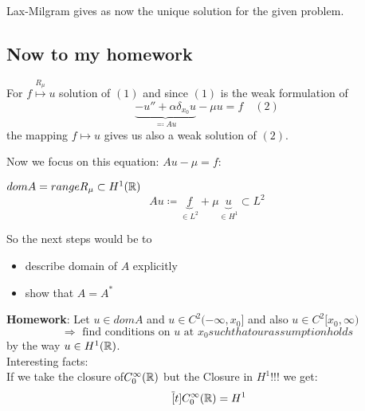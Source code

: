 Lax-Milgram gives as now the unique solution for the given problem.


\subsection{Now to my homework}
For $f \overset{R_{\mu}}{\mapsto} u$ solution of $(1)$ and since $(1)$ is the weak formulation of 
	\[ \underbrace{- u'' + \alpha \delta_{x_{0}} u}_{\eqqcolon A u} - \mu u = f \quad (2)\]
the mapping $f \mapsto u$ gives us also a weak solution of $(2)$.
\newline

Now we focus on this equation: $A u - \mu = f$: \\

\begin{definition}
	$dom A = range R_{\mu} \subset H^{1}(\mathbb{R})$
	\[ A u \coloneqq \underbrace{f}_{\in L^{2}} + \mu \underbrace{u}_{\in H^{1}} \subset L^{2}  \]	
\end{definition}

So the next steps would be to 
\begin{itemize}
	\item describe domain of $A$ explicitly
	\item show that $A = A^{*}$
\end{itemize}


\textbf{Homework}: Let $u \in dom A$ and $u \in C^{2}(-\infty, x_{0}]$ and also $u \in C^{2}[x_{0}, \infty)$ \\
\[ \Rightarrow \text{ find conditions on } u \text{ at } x_{0} such that our assumption holds \]
by the way $u \in H^{1}(\mathbb{R})$. \\

Interesting facts: \\

If we take the closure of$ C_{0}^{\infty}(\mathbb{R})$ but the Closure in $H^{1}$!!! we get:
	\[ \overline[t]{C_{0}^{\infty}(\R)} = H^{1} \]

 \newpage  %
